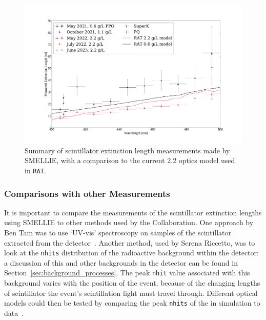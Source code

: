 \begin{figure}
    \centering
    \includegraphics[width=\textwidth]{5_SMELLIEAnalysis/images/ext_length_results_summary.pdf}
    \caption[Summary of scintillator extinction length measurements made by SMELLIE]
    {Summary of scintillator extinction length measurements made by SMELLIE, with a comparison to the current \SI{2.2}{\gpl} optics model used in \texttt{RAT}.}
    \label{fig:smellie_ext_length_final_results}
\end{figure}

\subsubsection{Comparisons with other Measurements}
It is important to compare the measurements of the scintillator extinction lengths using SMELLIE to other methods used by the Collaboration. One approach by Ben Tam was to use `UV-vis' spectroscopy on samples of the scintillator extracted from the detector~\cite{}. %
Another method, used by Serena Riccetto, was to look at the \texttt{nhits} distribution of the radioactive background  within the detector: a discussion of this and other backgrounds in the detector can be found in Section~\ref{sec:background_processes}. The peak \texttt{nhit} value associated with this background varies with the position of the event, because of the changing lengths of scintillator the event's scintillation light must travel through. Different optical models could then be tested by comparing the peak \texttt{nhits} of the  in simulation to data~\cite{}. %

